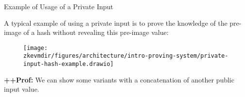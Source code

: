 \begin{frame}[fragile]{Example of Usage of a Private Input}

A typical example of using a private input is to prove the knowledge of
the pre-image of a hash without revealing this pre-image value:

\begin{figure}
\texttt{[image: \\zkevmdir/figures/architecture/intro-proving-system/private-input-hash-example.drawio]}
\end{figure}

\ifPROF
\vspace{0.2cm}
\scriptsize
\textbf{++Prof:} We can show some variants with a concatenation of another public input value.
\normalsize
\fi

\end{frame}







